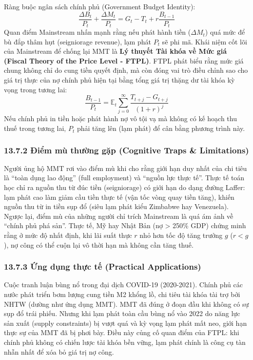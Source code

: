 \documentclass[
]{article}
\begin{document}
Ràng buộc ngân sách chính phủ (Government Budget Identity):
\[ \frac{\Delta B_{t}}{P_t} + \frac{\Delta M_{t}}{P_t} = G_t - T_t + r \frac{B_{t-1}}{P_t} \]
Quan điểm Mainstream nhấn mạnh rằng nếu phát hành tiền (\(\Delta M_t\))
quá mức để bù đắp thâm hụt (seigniorage revenue), lạm phát \(P_t\) sẽ
phi mã. Khái niệm cốt lõi của Mainstream để chống lại MMT là \textbf{Lý
thuyết Tài khóa về Mức giá (Fiscal Theory of the Price Level - FTPL)}.
FTPL phát biểu rằng mức giá chung không chỉ do cung tiền quyết định, mà
còn đóng vai trò điều chỉnh sao cho giá trị thực của nợ chính phủ hiện
tại bằng tổng giá trị thặng dư tài khóa kỳ vọng trong tương lai:
\[ \frac{B_{t-1}}{P_t} = \mathbb{E}_t \sum_{j=0}^\infty \frac{T_{t+j} - G_{t+j}}{(1+r)^j} \]
Nếu chính phủ in tiền hoặc phát hành nợ vô tội vạ mà không có kế hoạch
thu thuế trong tương lai, \(P_t\) phải tăng lên (lạm phát) để cân bằng
phương trình này.

\subsubsection{13.7.2 Điểm mù thường gặp (Cognitive Traps \&
Limitations)}\label{ux111iux1ec3m-muxf9-thux1b0ux1eddng-gux1eb7p-cognitive-traps-limitations-96}

Người ủng hộ MMT rơi vào điểm mù khi cho rằng giới hạn duy nhất của chi
tiêu là ``toàn dụng lao động'' (full employment) và ``nguồn lực thực
tế''. Thực tế toán học chỉ ra nguồn thu từ đúc tiền (seigniorage) có
giới hạn do dạng đường Laffer: lạm phát cao làm giảm cầu tiền thực tế
(vận tốc vòng quay tiền tăng), khiến nguồn thu từ in tiền sụp đổ (siêu
lạm phát kiểu Zimbabwe hay Venezuela). Ngược lại, điểm mù của những
người chỉ trích Mainstream là quá ám ảnh về ``chính phủ phá sản''. Thực
tế, Mỹ hay Nhật Bản (nợ \textgreater{} 250\% GDP) chứng minh rằng ở mức
độ nhất định, khi lãi suất thực \(r\) nhỏ hơn tốc độ tăng trưởng \(g\)
(\(r < g\)), nợ công có thể cuộn lại vô thời hạn mà không cần tăng thuế.

\subsubsection{13.7.3 Ứng dụng thực tế (Practical
Applications)}\label{ux1ee9ng-dux1ee5ng-thux1ef1c-tux1ebf-practical-applications-52}

Cuộc tranh luận bùng nổ trong đại dịch COVID-19 (2020-2021). Chính phủ
các nước phát triển bơm lượng cung tiền M2 khổng lồ, chi tiêu tài khóa
tài trợ bởi NHTW (dường như ứng dụng MMT). MMT đã đúng ở đoạn đầu khi
không có sự sụp đổ trái phiếu. Nhưng khi lạm phát toàn cầu bùng nổ vào
2022 do năng lực sản xuất (supply constraints) bị vượt quá và kỳ vọng
lạm phát mất neo, giới hạn thực sự của MMT đã bị phơi bày. Điều này củng
cố quan điểm của FTPL: khi chính phủ không có chiến lược tài khóa bền
vững, lạm phát chính là công cụ tàn nhẫn nhất để xóa bỏ giá trị nợ công.
\end{document}

